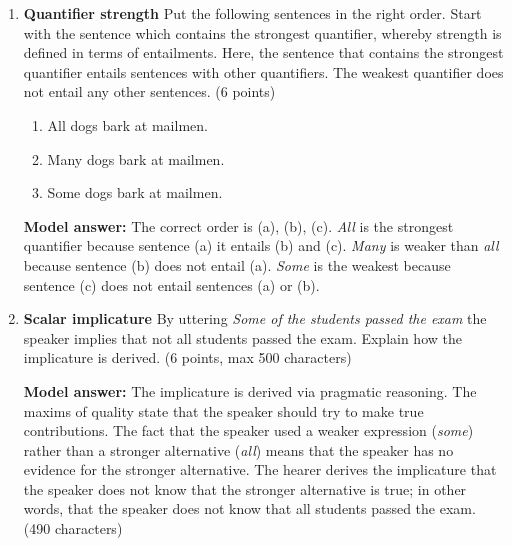 \documentclass[a4,11pt]{article}
\newcommand{\6}{\mbox{$[\hspace*{-.6mm}[$}}
\newcommand{\9}{\mbox{$]\hspace*{-.6mm}]$}}
\begin{document}
\begin{enumerate}[leftmargin = 12pt]
{ \bf Model answer:} The correct answer is (a).

\item { \bf  Quantifier strength} Put the following sentences in the right order. Start with the sentence which contains the strongest quantifier, whereby strength is defined in terms of entailments. Here, the sentence that contains the strongest quantifier entails sentences with other quantifiers. The weakest quantifier does not entail any other sentences. (6 points)

\begin{enumerate}[noitemsep]
\item All dogs bark at mailmen.
\item Many dogs bark at mailmen.
\item Some dogs bark at mailmen.
\end{enumerate}

{ \bf Model answer:} The correct order is (a), (b), (c). \textit{All} is the strongest quantifier because sentence (a) it entails (b) and (c). \textit{Many} is weaker than \textit{all} because sentence (b) does not entail (a). \textit{Some} is the weakest because sentence (c) does not entail sentences (a) or (b).

\item { \bf  Scalar implicature} By uttering {\it Some of the students passed the exam} the speaker implies that not all students passed the exam. Explain how the implicature is derived. (6 points, max 500 characters)

{ \bf Model answer:}  The implicature is derived via pragmatic reasoning. The maxims of quality state that the speaker should try to make true contributions. The fact that the speaker used a weaker expression (\textit{some}) rather than a stronger alternative (\textit{all}) means that the speaker has no evidence for the stronger alternative. The hearer derives the implicature that the speaker does not know that the stronger alternative is true; in other words, that the speaker does not know that all students passed the exam. (490 characters)

\end{enumerate}
\end{document}
